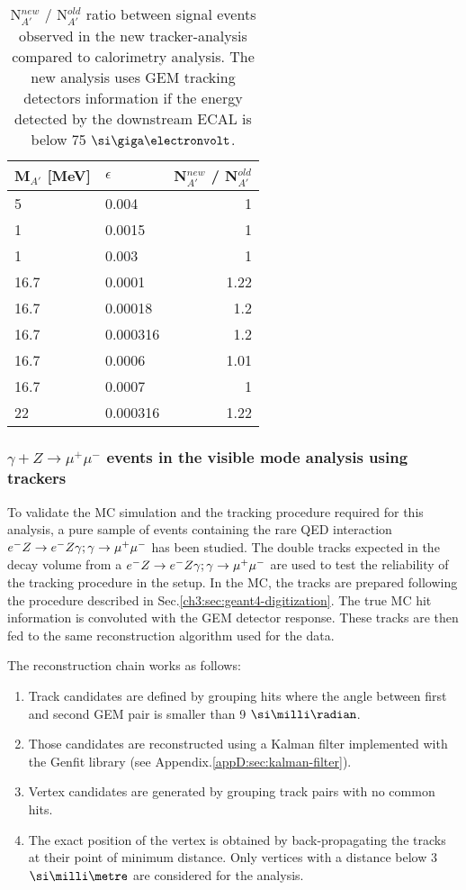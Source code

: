 \begin{table}[h!]
  \centering
  \begin{tabular}{|llr|}
    \hline
    M$_{A'}$ [MeV]& $\epsilon$ & N$^{new}_{A'}$ / N$^{old}_{A'}$ \\    
    \hline
    5    & 0.004    & 1   \\    
    1    & 0.0015   & 1   \\    
    1    & 0.003    & 1   \\    
    16.7 & 0.0001   & 1.22\\
    16.7 & 0.00018  & 1.2 \\    
    16.7 & 0.000316 & 1.2 \\
    16.7 & 0.0006   & 1.01\\
    16.7 & 0.0007   & 1   \\
    22   & 0.000316 & 1.22\\
    \hline    
  \end{tabular}
  \caption[ratio between signal events observed in tracker-analysis compared to calorimeter-only analysis]{N$^{new}_{A'}$ / N$^{old}_{A'}$ ratio between signal events observed in the new tracker-analysis compared to calorimetry analysis. The new analysis uses GEM tracking detectors information if the energy detected by the downstream ECAL is below 75 $\gev$.}
  \label{tab:dm:efftable}
\end{table}

\subsubsection{$\gamma + Z \rightarrow \mu^+ \mu^-$ events in the visible mode analysis using trackers}
\label{ch3:sec:vis-mode-tracking-dimuon}

To validate the MC simulation and the tracking procedure required for this analysis, a pure sample of events containing the rare QED interaction $e^- Z \to e^- Z \gamma; \gamma \to \mu^+ \mu^-$ has been studied. The double tracks expected in the decay volume from a $e^- Z \to e^- Z \gamma; \gamma \to \mu^+ \mu^-$ are used to test the reliability of the tracking procedure in the setup. In the MC, the tracks are prepared following the procedure described in Sec.\ref{ch3:sec:geant4-digitization}. The true MC hit information is convoluted with the GEM detector response. These tracks are then fed to the same reconstruction algorithm used for the data.

The reconstruction chain works as follows:
\begin{enumerate}
\item Track candidates are defined by grouping hits where the angle between first and second GEM pair is smaller than 9 $\mrad$.
\item Those candidates are reconstructed using a Kalman filter implemented with the Genfit library \cite{genfit} (see Appendix.\ref{appD:sec:kalman-filter}).
\item Vertex candidates are generated by grouping track pairs with no common hits.
\item The exact position of the vertex is obtained by back-propagating the tracks at their point of minimum distance. Only vertices with a distance below 3 $\mmi$ are considered for the analysis.
\end{enumerate}

